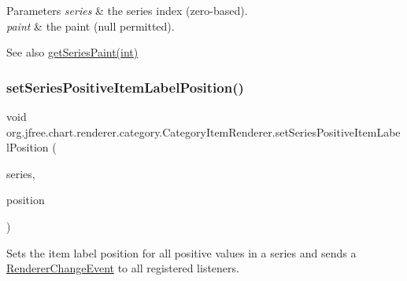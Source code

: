 \begin{DoxyParams}{Parameters}
{\em series} & the series index (zero-\/based). \\
\hline
{\em paint} & the paint ({\ttfamily null} permitted).\\
\hline
\end{DoxyParams}
\begin{DoxySeeAlso}{See also}
\mbox{\hyperlink{interfaceorg_1_1jfree_1_1chart_1_1renderer_1_1category_1_1_category_item_renderer_a43c98426743800cd392cc9e19b865c67}{get\+Series\+Paint(int)}} 
\end{DoxySeeAlso}
\mbox{\label{interfaceorg_1_1jfree_1_1chart_1_1renderer_1_1category_1_1_category_item_renderer_aa18ccd691341104faff52214b09a288e}} 
\subsubsection{\texorpdfstring{set\+Series\+Positive\+Item\+Label\+Position()}{setSeriesPositiveItemLabelPosition()}\hspace{0.1cm}{\footnotesize\ttfamily [1/2]}}
{\footnotesize\ttfamily void org.\+jfree.\+chart.\+renderer.\+category.\+Category\+Item\+Renderer.\+set\+Series\+Positive\+Item\+Label\+Position (\begin{DoxyParamCaption}\item[{int}]{series,  }\item[{\mbox{\hyperlink{classorg_1_1jfree_1_1chart_1_1labels_1_1_item_label_position}{Item\+Label\+Position}}}]{position }\end{DoxyParamCaption})}

Sets the item label position for all positive values in a series and sends a \mbox{\hyperlink{}{Renderer\+Change\+Event}} to all registered listeners.


